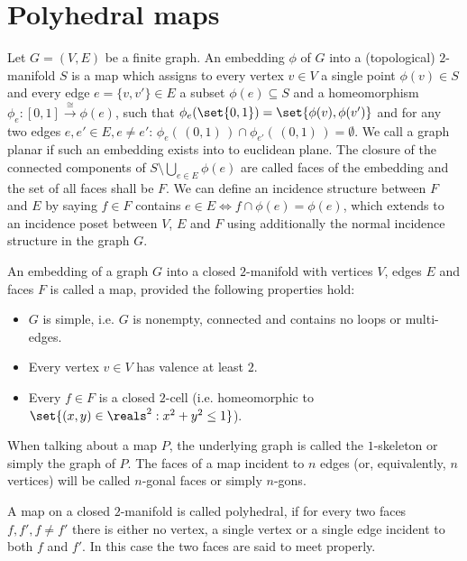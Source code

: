 \section{Polyhedral maps}\label{sec:polymap}
\begin{definition}
  Let $G = (V, E)$ be a finite graph. An embedding $\phi$ of $G$ into a (topological) $2$-manifold $S$ is a map which assigns to every vertex $v \in V$ a single point $\phi(v) \in S$ and every edge $e = \{v, v'\} \in E$ a subset $\phi(e) \subseteq S$ and a homeomorphism $\phi_e : [0, 1] \stackrel{\cong}{\longrightarrow} \phi(e)$, such that $\phi_e(\set{0, 1}) = \set{\phi(v), \phi(v')}$ and for any two edges $e, e' \in E, e \neq e'$: $\phi_e(\,(0,1)\,) \cap \phi_{e'}(\,(0,1)\,) = \emptyset$. We call a graph planar if such an embedding exists into to euclidean plane. The closure of the connected components of $S \setminus \bigcup_{e \in E} \phi(e)$ are called faces of the embedding and the set of all faces shall be $F$. We can define an incidence structure between $F$ and $E$ by saying $f \in F$ contains $e \in E \iff f \cap \phi(e) = \phi(e)$, which extends to an incidence poset between $V$, $E$ and $F$ using additionally the normal incidence structure in the graph $G$.
\end{definition}

\begin{definition} \label{def:map} An embedding of a graph $G$ into a closed $2$-manifold with vertices $V$, edges $E$ and faces $F$ is called a map, provided the following properties hold:
  \begin{itemize}
  \item $G$ is simple, i.e. $G$ is nonempty, connected and contains no loops or multi-edges.
  \item Every vertex $v \in V$ has valence at least $2$.
  \item Every $f \in F$ is a closed $2$-cell (i.e. homeomorphic to $\set{(x, y) \in \reals^2 : x^2 + y^2 \leq 1}$).
  \end{itemize}
  When talking about a map $P$, the underlying graph is called the $1$-skeleton or simply the graph of $P$. The faces of a map incident to $n$ edges (or, equivalently, $n$ vertices) will be called $n$-gonal faces or simply $n$-gons.
\end{definition}

\begin{definition} \label{def:polymap} A map on a closed $2$-manifold is called polyhedral, if for every two faces $f, f', f \neq f'$ there is either no vertex, a single vertex or a single edge incident to both $f$ and $f'$. In this case the two faces are said to meet properly.
\end{definition}

